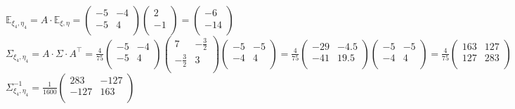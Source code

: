 \documentclass{article}
\begin{document}
$\mathbb{E}_{\xi_{4},\eta_{4}}=A\cdot \mathbb{E}_{\xi,\eta}=
\left(
  	{\begin{array}{cc}
    	-5 & -4\\
    	-5 & 4\\
  	\end{array}}
\right)
\left(
  	{\begin{array}{c}
    		2\\
    		-1\\
  	\end{array}}
\right)=
\left(
  	{\begin{array}{c}
    		-6\\
    		-14\\
  	\end{array}}
\right)$\\

$\Sigma_{\xi_{4},\eta_{4}}=A\cdot\Sigma\cdot A^\top=\frac{4}{75}
\left(
	{\begin{array}{cc}
    		-5 & -4\\
     	-5 & 4\\
  	\end{array}} 
\right)
\left(
	{\begin{array}{cc}
    		7 & -\frac{3}{2}\\
     	-\frac{3}{2} & 3\\
  	\end{array}} 
\right)
\left(
	{\begin{array}{cc}
    		-5 & -5\\
     	-4 & 4\\
  	\end{array}} 
\right)=\frac{4}{75}
\left(
	{\begin{array}{cc}
    		-29 & -4.5\\
     	-41 & 19.5\\
  	\end{array}} 
\right)
\left(
	{\begin{array}{cc}
    		-5 & -5\\
     	-4 & 4\\
  	\end{array}} 
\right)=\frac{4}{75}
\left(
	{\begin{array}{cc}
    		163 & 127\\
     	127 & 283\\
  	\end{array}} 
\right)
$\\

$\Sigma_{\xi_{4},\eta_{4}}^{-1}=\frac{1}{1600}\left({\begin{array}{cc}
    283 & -127\\
    -127 & 163\\
  \end{array} } \right)$\\
\end{document}
